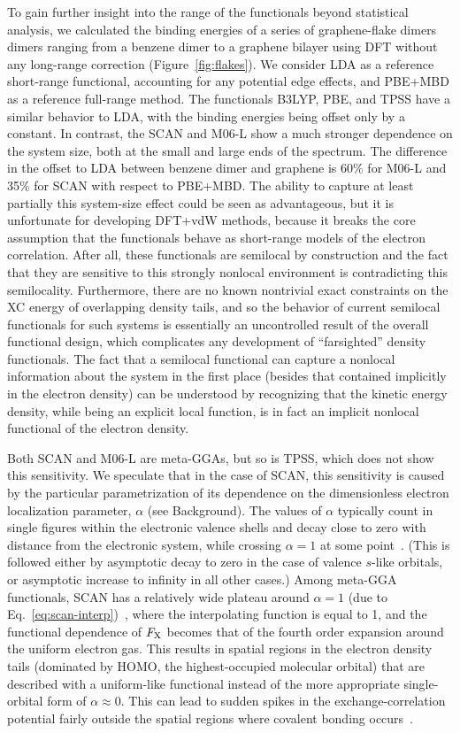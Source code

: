 To gain further insight into the range of the functionals beyond statistical analysis, we calculated the binding energies of a series of graphene-flake dimers dimers ranging from a benzene dimer to a graphene bilayer using DFT without any long-range correction (Figure~\ref{fig:flakes}).
We consider LDA as a reference short-range functional, accounting for any potential edge effects, and PBE+MBD as a reference full-range method.
The functionals B3LYP, PBE, and TPSS have a similar behavior to LDA, with the binding energies being offset only by a constant.
In contrast, the SCAN and M06-L show a much stronger dependence on the system size, both at the small and large ends of the spectrum.
The difference in the offset to LDA between benzene dimer and graphene is 60\% for M06-L and 35\% for SCAN with respect to PBE+MBD\@.
The ability to capture at least partially this system-size effect could be seen as advantageous, but it is unfortunate for developing DFT+vdW methods, because it breaks the core assumption that the functionals behave as short-range models of the electron correlation.
After all, these functionals are semilocal by construction and the fact that they are sensitive to this strongly nonlocal environment is contradicting this semilocality.
Furthermore, there are no known nontrivial exact constraints on the XC energy of overlapping density tails, and so the behavior of current semilocal functionals for such systems is essentially an uncontrolled result of the overall functional design, which complicates any development of ``farsighted'' density functionals.
The fact that a semilocal functional can capture a nonlocal information about the system in the first place (besides that contained implicitly in the electron density) can be understood by recognizing that the kinetic energy density, while being an explicit local function, is in fact an implicit nonlocal functional of the electron density.

Both SCAN and M06-L are meta-GGAs, but so is TPSS, which does not show this sensitivity.
We speculate that in the case of SCAN, this sensitivity is caused by the particular parametrization of its dependence on the dimensionless electron localization parameter, $\alpha$ (see Background).
The values of $\alpha$ typically count in single figures within the electronic valence shells and decay close to zero with distance from the electronic system, while crossing $\alpha=1$ at some point~\cite{SunPRL13,BeckeJCP90}.
(This is followed either by asymptotic decay to zero in the case of valence $s$-like orbitals, or asymptotic increase to infinity in all other cases.)
Among meta-GGA functionals, SCAN has a relatively wide plateau around $\alpha=1$ (due to Eq.~\ref{eq:scan-interp})~\cite{LoosJCP17}, where the interpolating function is equal to 1, and the functional dependence of $F_\text X$ becomes that of the fourth order expansion around the uniform electron gas.
This results in spatial regions in the electron density tails (dominated by HOMO, the highest-occupied molecular orbital) that are described with a uniform-like functional instead of the more appropriate single-orbital form of $\alpha\approx0$.
This can lead to sudden spikes in the exchange-correlation potential fairly outside the spatial regions where covalent bonding occurs~\cite{Gerit-private}.

